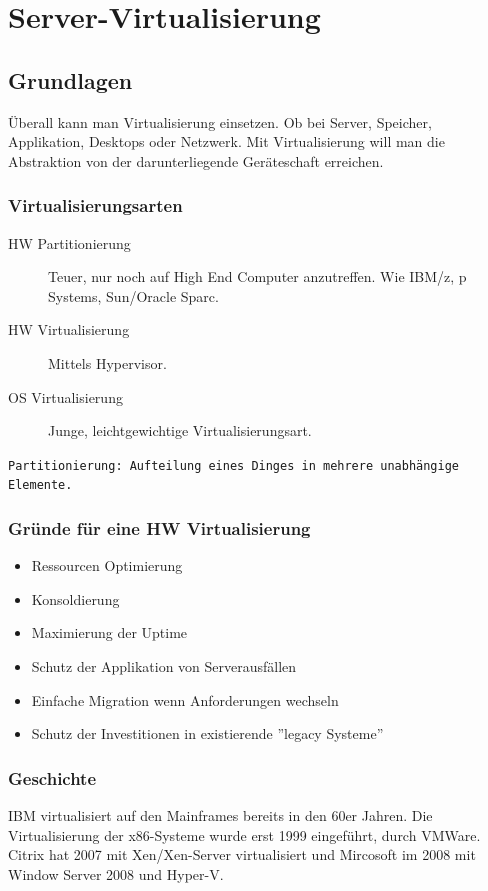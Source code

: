 \chapter{Server-Virtualisierung}

\section{Grundlagen}
Überall kann man Virtualisierung einsetzen. Ob bei Server, Speicher, Applikation, Desktops oder Netzwerk. Mit Virtualisierung will man die Abstraktion von der darunterliegende Geräteschaft erreichen.

\subsection{Virtualisierungsarten}
\label{sec:virtualisierungsarten}
\begin{description}
	\item[HW Partitionierung] Teuer, nur noch auf High End Computer anzutreffen. Wie IBM/z, p Systems, Sun/Oracle Sparc.
	\item[HW Virtualisierung] Mittels Hypervisor.
	\item[OS Virtualisierung] Junge, leichtgewichtige Virtualisierungsart. 
\end{description}

\texttt{Partitionierung: Aufteilung eines Dinges in mehrere unabhängige Elemente.}

\subsection{Gründe für eine HW Virtualisierung}
\label{sec:gruende-hw-virtualisierung}
\begin{itemize}
	\item Ressourcen Optimierung
	\item Konsoldierung
	\item Maximierung der Uptime
	\item Schutz der Applikation von Serverausfällen
	\item Einfache Migration wenn Anforderungen wechseln
	\item Schutz der Investitionen in existierende ''legacy Systeme'' 
\end{itemize}

\subsection{Geschichte}
IBM virtualisiert auf den Mainframes bereits in den 60er Jahren. Die Virtualisierung der x86-Systeme wurde erst 1999 eingeführt, durch VMWare. Citrix hat 2007 mit Xen/Xen-Server virtualisiert und Mircosoft im 2008 mit Window Server 2008 und Hyper-V.


